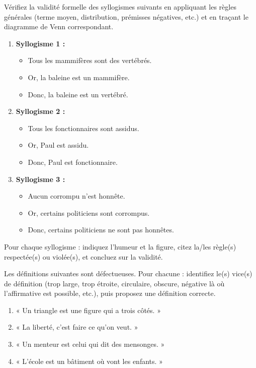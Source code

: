 \documentclass[11pt]{article}
\begin{document}
\begin{exercice}
Vérifiez la validité formelle des syllogismes suivants en appliquant les règles générales (terme moyen, distribution, prémisses négatives, etc.) et en traçant le diagramme de Venn correspondant.
\begin{enumerate}
    \item \textbf{Syllogisme 1 :}
    \begin{itemize}
        \item Tous les mammifères sont des vertébrés.
        \item Or, la baleine est un mammifère.
        \item Donc, la baleine est un vertébré.
    \end{itemize}
    \item \textbf{Syllogisme 2 :}
    \begin{itemize}
        \item Tous les fonctionnaires sont assidus.
        \item Or, Paul est assidu.
        \item Donc, Paul est fonctionnaire.
    \end{itemize}
    \item \textbf{Syllogisme 3 :}
    \begin{itemize}
        \item Aucun corrompu n'est honnête.
        \item Or, certains politiciens sont corrompus.
        \item Donc, certains politiciens ne sont pas honnêtes.
    \end{itemize}
\end{enumerate}
Pour chaque syllogisme : indiquez l'humeur et la figure, citez la/les règle(s) respectée(s) ou violée(s), et concluez sur la validité.
\end{exercice}

\begin{exercice}
Les définitions suivantes sont défectueuses. Pour chacune : identifiez le(s) vice(s) de définition (trop large, trop étroite, circulaire, obscure, négative là où l'affirmative est possible, etc.), puis proposez une définition correcte.
\begin{enumerate}
    \item « Un triangle est une figure qui a trois côtés. »
    \item « La liberté, c'est faire ce qu'on veut. »
    \item « Un menteur est celui qui dit des mensonges. »
    \item « L'école est un bâtiment où vont les enfants. »
\end{enumerate}
\end{exercice}
\end{document}
